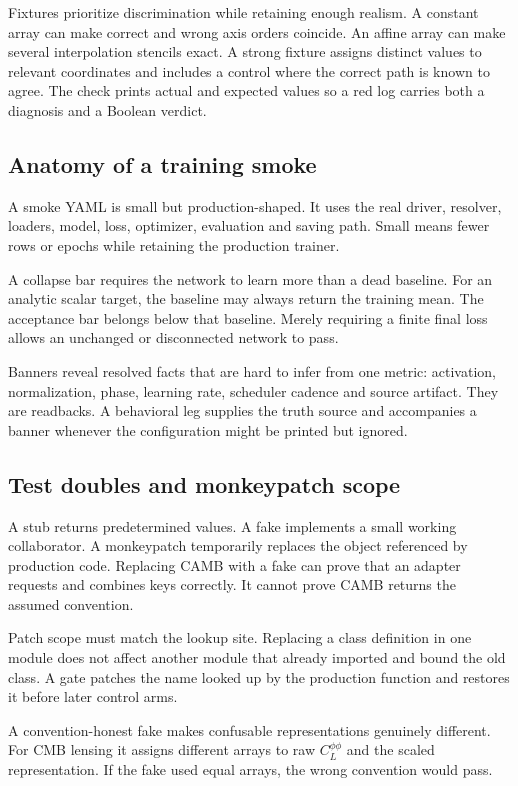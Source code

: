 \documentclass[10pt,aps,prd,twocolumn,nofootinbib]{revtex4-2}
\begin{document}
Fixtures prioritize discrimination while retaining enough realism.  A
constant array can make correct and wrong axis orders coincide.  An affine
array can make several interpolation stencils exact.  A strong fixture assigns
distinct values to relevant coordinates and includes a control where the
correct path is known to agree.  The check prints actual and expected values
so a red log carries both a diagnosis and a Boolean verdict.

\subsection{Anatomy of a training smoke}

A smoke YAML is small but production-shaped.  It uses the real driver,
resolver, loaders, model, loss, optimizer, evaluation and saving path.  Small
means fewer rows or epochs while retaining the production trainer.

A collapse bar requires the network to learn more than a dead baseline.  For
an analytic scalar target, the baseline may always return the training mean.
The acceptance bar belongs below that baseline.  Merely requiring a finite
final loss allows an unchanged or disconnected network to pass.

Banners reveal resolved facts that are hard to infer from one metric:
activation, normalization, phase, learning rate, scheduler cadence and source
artifact.  They are readbacks.  A behavioral leg supplies the truth source and accompanies
a banner whenever the configuration might be printed but ignored.

\subsection{Test doubles and monkeypatch scope}

A stub returns predetermined values.  A fake implements a small working
collaborator.  A monkeypatch temporarily replaces the object referenced by
production code.  Replacing CAMB with a fake can prove that an adapter
requests and combines keys correctly.  It cannot prove CAMB returns the
assumed convention.

Patch scope must match the lookup site.  Replacing a class definition in one
module does not affect another module that already imported and bound the old
class.  A gate patches the name looked up by the production function and
restores it before later control arms.

A convention-honest fake makes confusable representations genuinely
different.  For CMB lensing it assigns different arrays to raw
\(C_L^{\phi\phi}\) and the scaled representation.  If the fake used equal
arrays, the wrong convention would pass.
\end{document}
